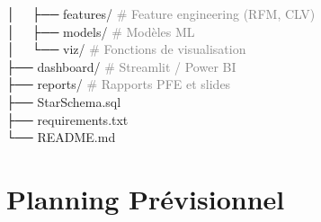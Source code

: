 \documentclass[11pt,a4paper]{article}
\begin{document}
\begin{tcolorbox}[
  enhanced, colback=codebg, colframe=graytext!40,
  boxrule=0.5pt, arc=3pt,
  top=8pt, bottom=8pt, left=12pt, right=12pt,
  fontupper=\ttfamily\small\color{darktext}
]
\hspace*{2em}│~~ ├── features/  \hspace{1em}\textcolor{graytext}{\# Feature engineering (RFM, CLV)}        \\
\hspace*{2em}│~~ ├── models/    \hspace{1.6em}\textcolor{graytext}{\# Modèles ML}                          \\
\hspace*{2em}│~~ └── viz/       \hspace{2.2em}\textcolor{graytext}{\# Fonctions de visualisation}          \\
\hspace*{1em}├── dashboard/     \hspace{1.2em}\textcolor{graytext}{\# Streamlit / Power BI}                 \\
\hspace*{1em}├── reports/       \hspace{1.6em}\textcolor{graytext}{\# Rapports PFE et slides}               \\
\hspace*{1em}├── StarSchema.sql                                                             \\
\hspace*{1em}├── requirements.txt                                                           \\
\hspace*{1em}└── README.md                                                                  \\
\end{tcolorbox}

\section{Planning Prévisionnel}
\end{document}
